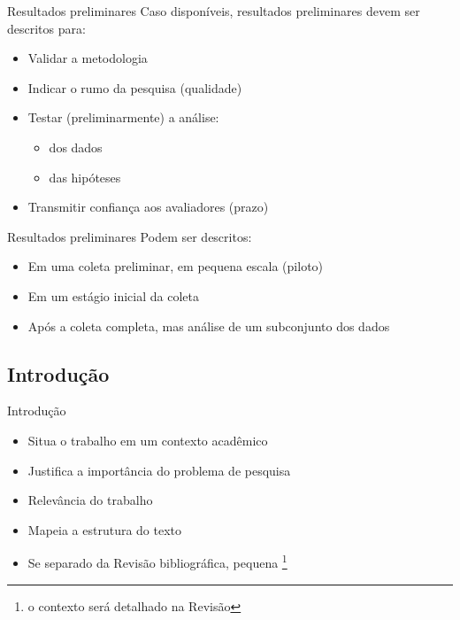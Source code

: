 \documentclass{beamer}
\begin{document}
\begin{frame}{Resultados preliminares}
  \footnotesize
  Caso disponíveis, resultados preliminares devem ser descritos para:
  \begin{itemize}
    \footnotesize
  \item Validar a metodologia
  \item Indicar o rumo da pesquisa (qualidade)
  \item Testar (preliminarmente) a análise:
    \begin{itemize}
      \scriptsize
    \item dos dados
    \item das hipóteses
    \end{itemize}
  \item Transmitir confiança aos avaliadores (prazo)
  \end{itemize}
\end{frame}

\begin{frame}{Resultados preliminares}
  Podem ser descritos:
  \begin{itemize}
    \footnotesize
  \item Em uma coleta preliminar, em pequena escala (piloto)
  \item Em um estágio inicial da coleta
  \item Após a coleta completa, mas análise de um subconjunto dos dados
  \end{itemize}
\end{frame}

\subsection{Introdução}

\begin{frame}{Introdução}
  \begin{itemize}
    \footnotesize
  \item Situa o trabalho em um contexto acadêmico
  \item Justifica a importância do problema de pesquisa
  \item Relevância do trabalho
  \item Mapeia a estrutura do texto
  \item Se separado da Revisão bibliográfica, pequena \footnote{o
      contexto será detalhado na Revisão}
  \end{itemize}
\end{frame}
\end{document}
